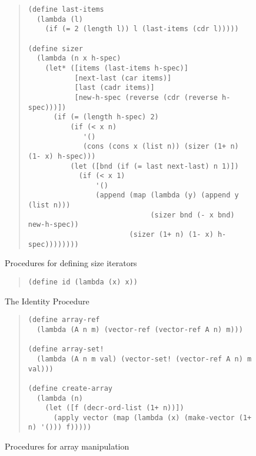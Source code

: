 \begin{figure}
\begin{frameit}
\begin{quote}
\begin{verbatim}
(define last-items
  (lambda (l)
    (if (= 2 (length l)) l (last-items (cdr l)))))

(define sizer
  (lambda (n x h-spec)
    (let* ([items (last-items h-spec)]
           [next-last (car items)]
           [last (cadr items)]
           [new-h-spec (reverse (cdr (reverse h-spec)))])
      (if (= (length h-spec) 2)
          (if (< x n)
             '()
             (cons (cons x (list n)) (sizer (1+ n) (1- x) h-spec)))
          (let ([bnd (if (= last next-last) n 1)])
            (if (< x 1)
                '()
                (append (map (lambda (y) (append y (list n)))
                             (sizer bnd (- x bnd) new-h-spec))
                        (sizer (1+ n) (1- x) h-spec))))))))
\end{verbatim}
\end{quote}
\caption{Procedures for defining size iterators}
\label{fig:size-iter}
\end{frameit}
\end{figure}
\begin{figure}
\begin{frameit}
\begin{quote}
\begin{verbatim}
(define id (lambda (x) x))
\end{verbatim}
\end{quote}
\caption{The Identity Procedure}
\label{fig:ident-proc}
\end{frameit}
\end{figure}
\begin{figure}
\begin{frameit}
\begin{quote}
\begin{verbatim}
(define array-ref
  (lambda (A n m) (vector-ref (vector-ref A n) m)))

(define array-set!
  (lambda (A n m val) (vector-set! (vector-ref A n) m val)))

(define create-array
  (lambda (n)
    (let ([f (decr-ord-list (1+ n))])
      (apply vector (map (lambda (x) (make-vector (1+ n) '())) f)))))
\end{verbatim}
\end{quote}
\caption{Procedures for array manipulation}
\label{fig:array-manip}
\end{frameit}
\end{figure}

